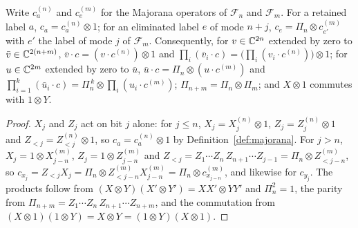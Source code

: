 \begin{lemma}\label{lem:jw}
Write $c^{(n)}_a$ and $c^{(m)}_e$ for the Majorana operators of $\mathcal F_n$ and $\mathcal F_m$.
For a retained label $a$, $c_a=c^{(n)}_a\otimes1$; for an eliminated label $e$ of mode $n+j$,
$c_e=\Pi_n\otimes c^{(m)}_{e'}$ with $e'$ the label of mode $j$ of $\mathcal F_m$. Consequently,
for $v\in\mathbb C^{2n}$ extended by zero to $\bar v\in\mathbb C^{2(n+m)}$, $\bar v\cdot c=(v\cdot c^{(n)})\otimes1$ and
$\prod_i(\bar v_i\cdot c)=\bigl(\prod_i(v_i\cdot c^{(n)})\bigr)\otimes1$; for $u\in\mathbb C^{2m}$
extended by zero to $\bar u$, $\bar u\cdot c=\Pi_n\otimes(u\cdot c^{(m)})$ and
$\prod_{i=1}^k(\bar u_i\cdot c)=\Pi_n^{\,k}\otimes\prod_i(u_i\cdot c^{(m)})$; $\Pi_{n+m}=\Pi_n\otimes\Pi_m$;
and $X\otimes1$ commutes with $1\otimes Y$.
\end{lemma}
\begin{proof}
$X_j$ and $Z_j$ act on bit $j$ alone: for $j\leq n$, $X_j=X^{(n)}_j\otimes1$, $Z_j=Z^{(n)}_j\otimes1$
and $Z_{<j}=Z^{(n)}_{<j}\otimes1$, so $c_a=c^{(n)}_a\otimes1$ by Definition~\ref{def:majorana}. For
$j>n$, $X_j=1\otimes X^{(m)}_{j-n}$, $Z_j=1\otimes Z^{(m)}_{j-n}$ and
$Z_{<j}=Z_1\cdots Z_n\,Z_{n+1}\cdots Z_{j-1}=\Pi_n\otimes Z^{(m)}_{<j-n}$, so
$c_{x_j}=Z_{<j}X_j=\Pi_n\otimes Z^{(m)}_{<j-n}X^{(m)}_{j-n}=\Pi_n\otimes c^{(m)}_{x_{j-n}}$, and likewise for
$c_{y_j}$. The products follow from $(X\otimes Y)(X'\otimes Y')=XX'\otimes YY'$ and $\Pi_n^2=1$, the
parity from $\Pi_{n+m}=Z_1\cdots Z_n\,Z_{n+1}\cdots Z_{n+m}$, and the commutation from
$(X\otimes1)(1\otimes Y)=X\otimes Y=(1\otimes Y)(X\otimes1)$.
\end{proof}

